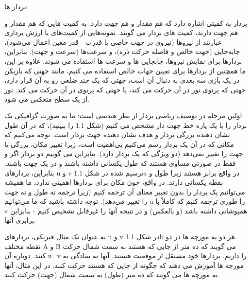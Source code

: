 {
بردار ها:

بردار به کمیتی اشاره دارد که هم مقدار و هم جهت دارد.
به کمیت هایی که هم مقدار و هم جهت دارند، کمیت های بردار می گویند.
نمونه‌هایی از کمیت‌های با ارزش برداری عبارتند از نیروها (نیروی در جهت خاصی با قدرت - قدر معین اعمال می‌شود)، جابه‌جایی (جهت خالص و فاصله حرکت ذره)، و سرعت‌ها (سرعت و جهت).
بنابراین، بردارها برای نمایش نیروها، جابجایی ها و سرعت ها استفاده می شوند.
علاوه بر این، ما همچنین از بردارها برای تعیین جهات خالص استفاده می کنیم، مانند جهتی که بازیکن در یک بازی سه بعدی به دنبال آن است،
جهتی که یک چند ضلعی رو به آن قرار دارد، جهتی که پرتوی نور در آن حرکت می کند،
یا جهتی که پرتوی در آن حرکت می کند. نور از یک سطح منعکس می شود.

اولین مرحله در توصیف ریاضی بردار از نظر هندسی است: ما به صورت گرافیکی یک بردار را با یک پاره خط جهت دار مشخص می کنیم (شکل 1.1 را ببینید)، که در آن طول نشان دهنده بزرگی بردار و هدف نشان دهنده جهت بردار است.
توجه می‌کنیم که مکانی که در آن یک بردار رسم می‌کنیم بی‌اهمیت است، زیرا تغییر مکان، بزرگی یا جهت را تغییر نمی‌دهد (دو ویژگی که یک بردار دارد).
بنابراین می گوییم دو بردار اگر و فقط در صورتی مساوی هستند که طول یکسانی داشته باشند و در یک جهت باشند.
بنابراین، بردارهای u و v ترسیم شده در شکل 1.1a در واقع برابر هستند زیرا طول و نقطه یکسانی دارند.
در واقع، چون مکان برای بردارها اهمیتی ندارد، ما همیشه می‌توانیم یک بردار را بدون تغییر معنای آن ترجمه کنیم (زیرا ترجمه نه طول و نه جهت را تغییر می‌دهد).
توجه داشته باشید که ما می‌توانیم u را طوری ترجمه کنیم که کاملاً با v همپوشانی داشته باشد (و بالعکس) و در نتیجه آنها را غیرقابل تشخیص کنیم - بنابراین برابری آنها.

به عنوان یک مثال فیزیکی، بردارهای u و v در شکل 1.1b هر دو به مورچه ها در دو نقطه مختلف A و B می گویند که ده متر از جایی که هستند به سمت شمال حرکت کنند.
دوباره آن u=v را داریم. بردارها خود مستقل از موقعیت هستند.
آنها به سادگی به مورچه ها آموزش می دهند که چگونه از جایی که هستند حرکت کنند.
در این مثال، آنها به مورچه ها می گویند که ده متر (طول) به سمت شمال (جهت) حرکت کنند.
}
